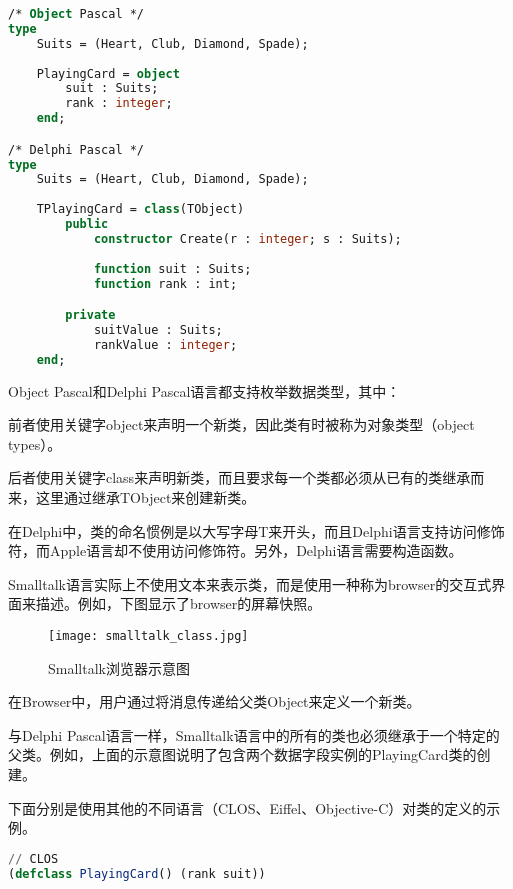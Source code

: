 \begin{lstlisting}[language=Pascal]
/* Object Pascal */
type 
	Suits = (Heart, Club, Diamond, Spade);
	
	PlayingCard = object
		suit : Suits;
		rank : integer;
	end;

/* Delphi Pascal */
type 
	Suits = (Heart, Club, Diamond, Spade);
	
	TPlayingCard = class(TObject)
		public 
			constructor Create(r : integer; s : Suits);
			
			function suit : Suits;
			function rank : int;

		private
			suitValue : Suits;
			rankValue : integer;
	end;
\end{lstlisting}



Object Pascal和Delphi Pascal语言都支持枚举数据类型，其中：

\begin{compactitem}
\item 前者使用关键字object来声明一个新类，因此类有时被称为对象类型（object types）。
\item 后者使用关键字class来声明新类，而且要求每一个类都必须从已有的类继承而来，这里通过继承TObject来创建新类。
\end{compactitem}

在Delphi中，类的命名惯例是以大写字母T来开头，而且Delphi语言支持访问修饰符，而Apple语言却不使用访问修饰符。另外，Delphi语言需要构造函数。


Smalltalk语言实际上不使用文本来表示类，而是使用一种称为browser的交互式界面来描述。例如，下图显示了browser的屏幕快照。

\begin{figure}[htbp]
\centering
\texttt{[image: smalltalk\_class.jpg]}
\caption{Smalltalk浏览器示意图}
\label{fig:smalltalk_class}
\end{figure}

在Browser中，用户通过将消息传递给父类Object来定义一个新类。

与Delphi Pascal语言一样，Smalltalk语言中的所有的类也必须继承于一个特定的父类。例如，上面的示意图说明了包含两个数据字段实例的PlayingCard类的创建。

下面分别是使用其他的不同语言（CLOS、Eiffel、Objective-C）对类的定义的示例。



\begin{lstlisting}[language=Lisp]
// CLOS
(defclass PlayingCard() (rank suit))
\end{lstlisting}






